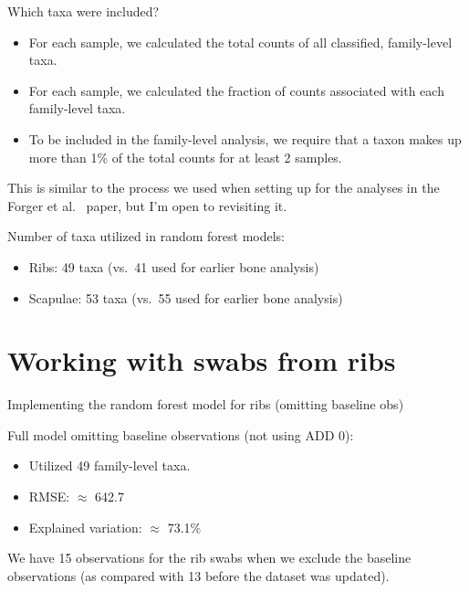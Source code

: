 \documentclass{beamer}
\begin{document}
\begin{frame}{Which taxa were included?}

  \begin{itemize}
  \item For each sample, we calculated the total counts of all classified,
family-level taxa.
  \item For each sample, we calculated the fraction of counts
associated with each family-level taxa. 
  \item To be included in the family-level analysis, we require that a taxon
  makes up more than 1\% of the total counts for at least 2 samples.
  \end{itemize}

  \vspace{0.1in}

  \noindent This is similar to the process we used when setting up for the
analyses in the Forger et al.~ paper, but I'm open to revisiting it.

  \vspace{0.1in}

  \noindent Number of taxa utilized in random forest models:
  \begin{itemize}
    \item Ribs: 49 taxa (vs.\ 41 used for earlier bone analysis)
    \item Scapulae: 53 taxa (vs.\ 55 used for earlier bone analysis)
  \end{itemize}


\end{frame}



\section[Rib swabs]{Working with swabs from ribs}


\begin{frame}{Implementing the random forest model for ribs (omitting baseline obs)}

  \noindent Full model omitting baseline observations (not using ADD 0):
  \begin{itemize}
    \item Utilized 49 family-level taxa.
    \item RMSE: $\approx$ 642.7  
    \item Explained variation: $\approx$ 73.1\%
  \end{itemize}
  \vspace{0.1in}

  \noindent We have 15 observations for the rib swabs when we exclude the
  baseline observations (as compared with 13 before the dataset was updated).

\end{frame}
\end{document}

